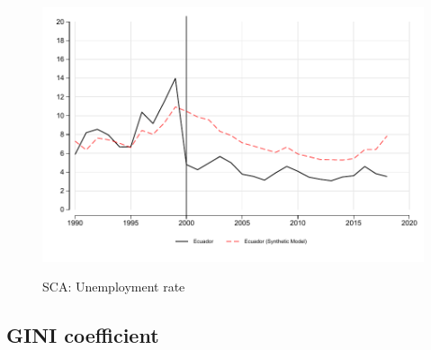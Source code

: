\documentclass[12pt]{article}
\begin{document}
\begin{figure}[!htbp]
    \caption{SCA: Unemployment rate}
    \centering
    \includegraphics{STATA/Fig_UNEMP_SCA.pdf}
    \label{fig:SCA_UNEMP}
\end{figure}

\subsection{GINI coefficient}



\newpage
\singlespacing
\printbibliography


\end{document}
